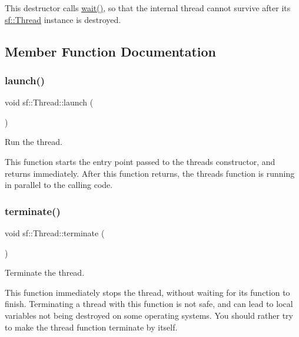 This destructor calls \hyperlink{classsf_1_1_thread_a724b1f94c2d54f84280f2f78bde95fa0}{wait()}, so that the internal thread cannot survive after its \hyperlink{classsf_1_1_thread}{sf\+::\+Thread} instance is destroyed. 

\subsection{Member Function Documentation}
\mbox{\label{classsf_1_1_thread_a74f75a9e86e1eb47479496314048b5f6}} 
\subsubsection{\texorpdfstring{launch()}{launch()}}
{\footnotesize\ttfamily void sf\+::\+Thread\+::launch (\begin{DoxyParamCaption}{ }\end{DoxyParamCaption})}



Run the thread. 

This function starts the entry point passed to the thread\textquotesingle{}s constructor, and returns immediately. After this function returns, the thread\textquotesingle{}s function is running in parallel to the calling code. \mbox{\label{classsf_1_1_thread_ad6b205d4f1ce38b8d44bba0f5501477c}} 
\subsubsection{\texorpdfstring{terminate()}{terminate()}}
{\footnotesize\ttfamily void sf\+::\+Thread\+::terminate (\begin{DoxyParamCaption}{ }\end{DoxyParamCaption})}



Terminate the thread. 

This function immediately stops the thread, without waiting for its function to finish. Terminating a thread with this function is not safe, and can lead to local variables not being destroyed on some operating systems. You should rather try to make the thread function terminate by itself. \mbox{\label{classsf_1_1_thread_a724b1f94c2d54f84280f2f78bde95fa0}} 
